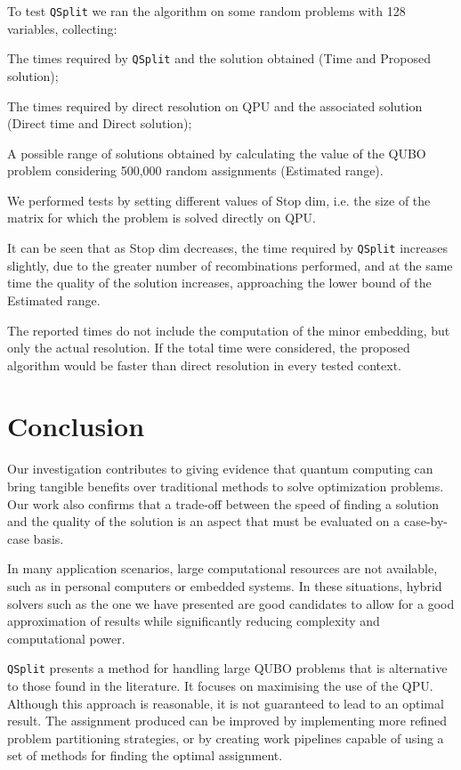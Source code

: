 \documentclass{ceurart}
\begin{document}
To test \verb|QSplit| we ran the algorithm on some random problems with 128 variables, collecting:
\begin{enumerate*}[label=\arabic*)]
    \item The times required by \verb|QSplit| and the solution obtained (Time and Proposed solution);
    \item The times required by direct resolution on QPU and the associated solution (Direct time and Direct solution);
    \item A possible range of solutions obtained by calculating the value of the QUBO problem considering 500,000 random assignments (Estimated range).
\end{enumerate*}
We performed tests by setting different values of Stop dim, i.e. the size of the matrix for which the problem is solved directly on QPU.

It can be seen that as Stop dim decreases, the time required by \verb|QSplit| increases slightly, due to the greater number of recombinations performed, and at the same time the quality of the solution increases, approaching the lower bound of the Estimated range.

The reported times do not include the computation of the minor embedding, but only the actual resolution. If the total time were considered, the proposed algorithm would be faster than direct resolution in every tested context.

\section{Conclusion}

Our investigation contributes to giving evidence that quantum computing can bring tangible benefits over traditional methods to solve optimization problems. Our work also confirms that a trade-off between the speed of finding a solution and the quality of the solution is an aspect that must be evaluated on a case-by-case basis.

In many application scenarios, large computational resources are not available, such as in personal computers or embedded systems. In these situations, hybrid solvers such as the one we have presented are good candidates to allow for a good approximation of results while significantly reducing complexity and computational power.

\verb|QSplit| presents a method for handling large QUBO problems that is alternative to those found in the literature\cite{subqubo1}\cite{subqubo2}. It focuses on maximising the use of the QPU. Although this approach is reasonable, it is not guaranteed to lead to an optimal result. The assignment produced can be improved by implementing more refined problem partitioning strategies\cite{bnb}, or by creating work pipelines capable of using a set of methods for finding the optimal assignment\cite{dwavehybrid}.


\end{document}
